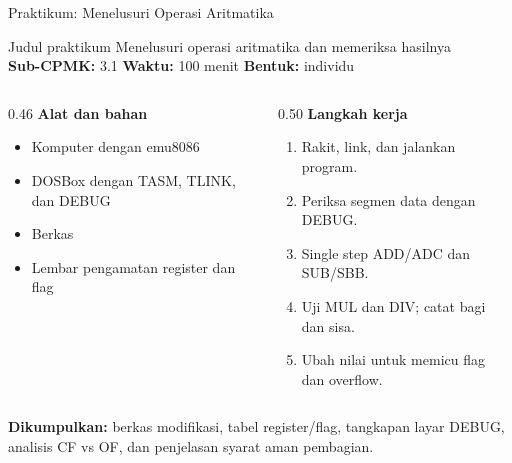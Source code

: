 \documentclass[aspectratio=169,11pt]{beamer}
\begin{document}
\begin{frame}{Praktikum: Menelusuri Operasi Aritmatika}
\begin{block}{Judul praktikum}
\small Menelusuri operasi aritmatika dan memeriksa hasilnya\\[0.15em]
\textbf{Sub-CPMK:} 3.1 \quad\textbullet\quad
\textbf{Waktu:} 100 menit \quad\textbullet\quad
\textbf{Bentuk:} individu
\end{block}

\vspace{0.2em}
\begin{columns}[t]
\begin{column}{0.46\textwidth}
{\color{obeBlue}\bfseries Alat dan bahan}
\begin{itemize}\footnotesize
    \item Komputer dengan emu8086
    \item DOSBox dengan TASM, TLINK, dan DEBUG
    \item Berkas 
    \item Lembar pengamatan register dan flag
\end{itemize}
\end{column}
\begin{column}{0.50\textwidth}
{\color{obeBlue}\bfseries Langkah kerja}
\begin{enumerate}\footnotesize
    \item Rakit, link, dan jalankan program.
    \item Periksa segmen data dengan DEBUG.
    \item Single step ADD/ADC dan SUB/SBB.
    \item Uji MUL dan DIV; catat bagi dan sisa.
    \item Ubah nilai untuk memicu flag dan overflow.
\end{enumerate}
\end{column}
\end{columns}

\vspace{0.2em}
{\footnotesize\textbf{Dikumpulkan:} berkas  modifikasi,
tabel register/flag, tangkapan layar DEBUG, analisis CF vs OF, dan
penjelasan syarat aman pembagian.\par}
\end{frame}
\end{document}
